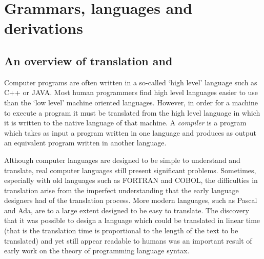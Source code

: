 \vspace*{\fill}
\begin{center}
\end{center}


\clearpage
{}
\tableofcontents
\clearpage
\setcounter{page}{0}
\chapter{Grammars, languages and derivations}
\section{An overview of translation and \gtbs}
Computer programs are often written in a so-called
`high level' language such as C++ or JAVA. Most human
programmers find high level languages easier to use than
the `low level' machine oriented languages.
However, in order for a machine to execute a program
it must  be translated from the high level language in
which it is written to the native language of that machine.
A {\em compiler} is a program which takes as input a program
written in one language and produces as output an
equivalent program written in another language.


Although computer languages are designed to be simple to understand and
translate, real computer languages still present significant
problems. Sometimes,
especially with old languages such as FORTRAN and COBOL, the
difficulties in translation arise from the imperfect understanding that
the early language designers had of the translation process. More modern
languages, such as Pascal and Ada, are to a large extent designed to be
easy to translate. The discovery that it was possible to design a
language which could be translated in linear time (that is the
translation time is proportional to the length of the text to be
translated) and yet still appear readable to humans was an important
result of early work on the theory of programming language syntax. 

